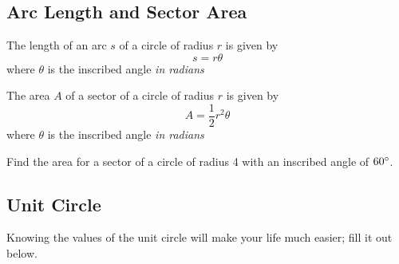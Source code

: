 \documentclass[notes]{subfiles}
\begin{document}
	\subsection*{Arc Length and Sector Area}
		\begin{rmk}
			The length of an arc \(s\) of a circle of radius \(r\) is given by
				\[s = r\theta\]
			where \(\theta\) is the inscribed angle \emph{in radians}
		\end{rmk}
		
		\begin{rmk}
			The area \(A\) of a sector of a circle of radius \(r\) is given by
				\[A = \dfrac{1}{2}r^2\theta\]
			where \(\theta\) is the inscribed angle \emph{in radians}
		\end{rmk}
			\newpage
			
		\begin{ex}
			Find the area for a sector of a circle of radius 4 with an inscribed angle of \(60^\circ\).
		\end{ex}
			
	\subsection*{Unit Circle}
		Knowing the values of the unit circle will make your life much easier; fill it out below.
\end{document}
